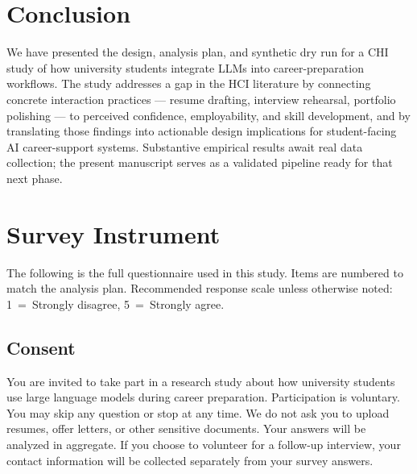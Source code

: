 \documentclass[sigconf,review,anonymous]{acmart}
\begin{document}
\section{Conclusion}

We have presented the design, analysis plan, and synthetic dry run for a
CHI study of how university students integrate LLMs into career-preparation
workflows.  The study addresses a gap in the HCI literature by connecting
concrete interaction practices --- resume drafting, interview rehearsal,
portfolio polishing --- to perceived confidence, employability, and skill
development, and by translating those findings into actionable design
implications for student-facing AI career-support systems.  Substantive
empirical results await real data collection; the present manuscript serves
as a validated pipeline ready for that next phase.




\appendix

\section{Survey Instrument}
\label{app:survey}

The following is the full questionnaire used in this study.  Items are
numbered to match the analysis plan.  Recommended response scale unless
otherwise noted: 1~=~Strongly disagree, 5~=~Strongly agree.

\subsection*{Consent}

You are invited to take part in a research study about how university
students use large language models during career preparation.  Participation
is voluntary.  You may skip any question or stop at any time.  We do not
ask you to upload resumes, offer letters, or other sensitive documents.
Your answers will be analyzed in aggregate.  If you choose to volunteer for
a follow-up interview, your contact information will be collected separately
from your survey answers.
\end{document}
